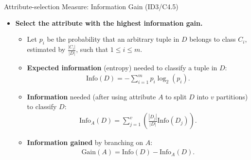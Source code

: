 \begin{frame}{Attribute-selection Measure: Information Gain (ID3/C4.5)}
  \begin{itemize}
  \item \textbf{Select the attribute with the highest information gain.}
    \begin{itemize}
    \item Let $p_i$ be the probability that an arbitrary tuple in $D$ belongs to class $C_i$,\\ estimated by $\frac{|C_i|}{|D|}$, such that $1 \leq i \leq m$.
    \item \textbf{Expected information} (entropy) needed to classify a tuple in $D$:
      \begin{align}
        \text{Info}(D) = -\sum_{i=1}^{m}p_i \log_2(p_i).
      \end{align}
    \item \textbf{Information} needed (after using attribute $A$ to split $D$ into $v$ partitions) to classify $D$:
      \begin{align}
        \text{Info}_A(D) = \sum_{j=1}^v \left( \frac{|D_j|}{|D|} \text{Info}(D_j) \right).
      \end{align}
    \item \textbf{Information gained} by branching on $A$:
      \begin{align}
        \text{Gain}(A)=\text{Info}(D)-\text{Info}_A(D).
      \end{align}
    \end{itemize}
  \end{itemize}
\end{frame}

